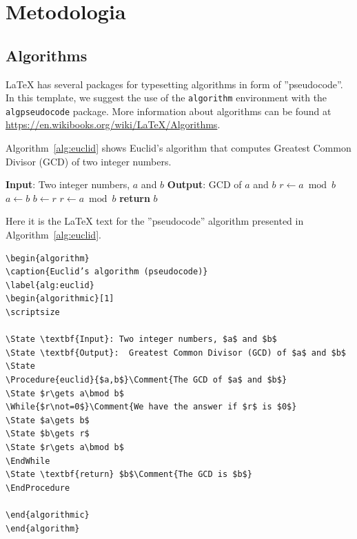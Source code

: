
\chapter{Metodologia} %
\label{chap:Chapter3} %

\section{Algorithms}

 \LaTeX{}  has several packages for typesetting algorithms in form of ''pseudocode''. In this template, we suggest the use of the \verb|algorithm| environment with the \verb|algpseudocode| package. 
More information about algorithms can be found at \url{https://en.wikibooks.org/wiki/LaTeX/Algorithms}.

Algorithm~\ref{alg:euclid} shows Euclid's algorithm that computes  Greatest Common Divisor (GCD) of two integer numbers.

\begin{algorithm}[b]
\caption{Euclid’s algorithm}
\label{alg:euclid}
\begin{algorithmic}[1]
\scriptsize

\State \textbf{Input}: Two integer numbers, $a$ and $b$
\State \textbf{Output}: GCD of $a$ and $b$
\State
{}
\State $r\gets a\bmod b$
\State $a\gets b$
\State $b\gets r$
\State $r\gets a\bmod b$
\EndWhile
\State \textbf{return} $b$
\EndProcedure

\end{algorithmic}
\end{algorithm}

Here it is the \LaTeX{} text for the ''pseudocode'' algorithm presented in  Algorithm~\ref{alg:euclid}.

\begin{verbatim}
\begin{algorithm}
\caption{Euclid’s algorithm (pseudocode)}
\label{alg:euclid}
\begin{algorithmic}[1]
\scriptsize

\State \textbf{Input}: Two integer numbers, $a$ and $b$
\State \textbf{Output}:  Greatest Common Divisor (GCD) of $a$ and $b$
\State
\Procedure{euclid}{$a,b$}\Comment{The GCD of $a$ and $b$}
\State $r\gets a\bmod b$
\While{$r\not=0$}\Comment{We have the answer if $r$ is $0$}
\State $a\gets b$
\State $b\gets r$
\State $r\gets a\bmod b$
\EndWhile
\State \textbf{return} $b$\Comment{The GCD is $b$}
\EndProcedure

\end{algorithmic}
\end{algorithm}
\end{verbatim}

